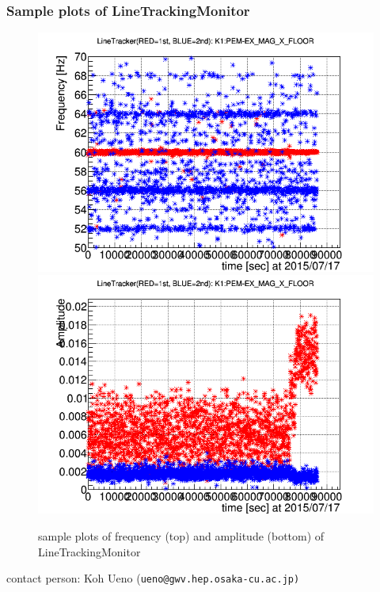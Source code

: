 \subsubsection{Sample plots of LineTrackingMonitor}

\begin{figure}[t]
 \begin{center}
    \includegraphics[width=0.9\hsize]{fig/LineTrackingMon/sample_freq.png}
    \includegraphics[width=0.9\hsize]{fig/LineTrackingMon/sample_amp.png}
    \caption{sample plots of frequency (top) and amplitude (bottom) of LineTrackingMonitor}
 \end{center}
\end{figure}

{\noindent \small contact person: Koh Ueno (\tt ueno@gwv.hep.osaka-cu.ac.jp)}

